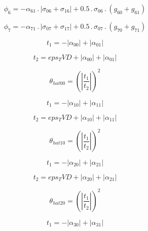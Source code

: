 \documentclass{article}
\begin{document}
\begin{dmath}\phi_{6} = - \alpha_{61} \,.\, \left|{\sigma_{0 6} + \sigma_{1 6}}\right| + 0.5 \,.\, \sigma_{0 6} \,.\, \left(g_{60} + g_{61}\right)\end{dmath}

\begin{dmath}\phi_{7} = - \alpha_{71} \,.\, \left|{\sigma_{0 7} + \sigma_{1 7}}\right| + 0.5 \,.\, \sigma_{0 7} \,.\, \left(g_{70} + g_{71}\right)\end{dmath}

\begin{dmath}t_{1} = - \left|{\alpha_{00}}\right| + \left|{\alpha_{01}}\right|\end{dmath}

\begin{dmath}t_{2} = eps_TVD + \left|{\alpha_{00}}\right| + \left|{\alpha_{01}}\right|\end{dmath}

\begin{dmath}\theta_{hat 00} = \left(\left|{\frac{t_{1}}{t_{2}}}\right| \right)^{2}\end{dmath}

\begin{dmath}t_{1} = - \left|{\alpha_{10}}\right| + \left|{\alpha_{11}}\right|\end{dmath}

\begin{dmath}t_{2} = eps_TVD + \left|{\alpha_{10}}\right| + \left|{\alpha_{11}}\right|\end{dmath}

\begin{dmath}\theta_{hat 10} = \left(\left|{\frac{t_{1}}{t_{2}}}\right| \right)^{2}\end{dmath}

\begin{dmath}t_{1} = - \left|{\alpha_{20}}\right| + \left|{\alpha_{21}}\right|\end{dmath}

\begin{dmath}t_{2} = eps_TVD + \left|{\alpha_{20}}\right| + \left|{\alpha_{21}}\right|\end{dmath}

\begin{dmath}\theta_{hat 20} = \left(\left|{\frac{t_{1}}{t_{2}}}\right| \right)^{2}\end{dmath}

\begin{dmath}t_{1} = - \left|{\alpha_{30}}\right| + \left|{\alpha_{31}}\right|\end{dmath}
\end{document}
